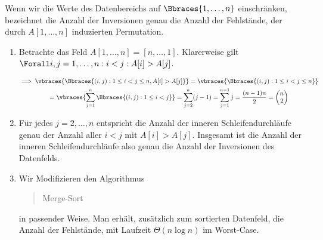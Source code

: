 \begin{solution}

Wenn wir die Werte des Datenbereichs auf $\Bbraces{1, \dots, n}$ einschränken, bezeichnet die Anzahl der Inversionen genau die Anzahl der Fehlstände, der durch $A[1, \dots, n]$ induzierten Permutation.

\begin{enumerate}[label = (\alph*)]

  \item Betrachte das Feld $A[1, \dots, n] = [n, \dots, 1]$.
  Klarerweise gilt $\Forall i, j = 1, \dots, n: i < j: A[i] > A[j]$.

  \begin{multline*}
    \implies
    \vbraces
    {
      \Bbraces
      {
        (i, j):
        1 \leq i < j \leq n,
        A[i] > A[j]
      }
    }
    =
    \vbraces
    {
      \Bbraces
      {
        (i, j):
        1 \leq i < j \leq n
      }
    } \\
    =
    \vbraces
    {
      \sum_{j=1}^n
      \Bbraces
      {
        (i, j):
        1 \leq i < j
      }
    }
    =
    \sum_{j=2}^n (j-1)
    =
    \sum_{j=1}^{n-1} j
    =
    \frac{(n - 1) n}{2}
    =
    \begin{pmatrix}
      n \\
      2
    \end{pmatrix}
  \end{multline*}

  \item Für jedes $j = 2, \dots, n$ entspricht die Anzahl der inneren Schleifendurchläufe genau der Anzahl aller $i < j$ mit $A[i] > A[j]$.
  Insgesamt ist die Anzahl der inneren Schleifendurchläufe also genau die Anzahl der Inversionen des Datenfelds.


  \item Wir Modifizieren den Algorithmus \blockquote{Merge-Sort} in passender Weise.
  Man erhält, zusätzlich zum sortierten Datenfeld, die Anzahl der Fehlstände, mit Laufzeit $\Theta(n \log n)$ im Worst-Case.


\end{enumerate}
\end{solution}

